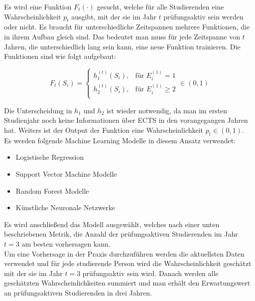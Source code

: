 Es wird eine Funktion $F_t(\cdot)$ gesucht, welche f\"ur alle Studierenden eine Wahrscheinlichkeit $p_t$ ausgibt, mit der
sie im Jahr $t$ pr\"ufungsaktiv sein werden oder nicht. Es braucht f\"ur unterschiedliche Zeitspannen mehrere Funktionen, die in ihrem Aufbau gleich sind.
Das bedeutet man muss f\"ur jede Zeitspanne von $t$ Jahren, die unterschiedlich lang sein kann, eine neue Funktion trainieren.
Die Funktionen sind wie folgt aufgebaut:

$$
  F_t(S_i)=
  \left\{
  \begin{array}{lr}
    h_1^{(t)}(S_i), & \text{für }E_i^{(1)} = 1    \\
    h_2^{(t)}(S_i), & \text{für }E_i^{(1)} \geq 2 \\
  \end{array}
  \right.
  \in (0,1)
$$

Die Unterscheidung in $h_1$ und $h_2$ ist wieder notwendig, da man im ersten Studienjahr noch keine Informationen \"uber ECTS in den vorangegangen Jahren hat.
Weiters ist der Output der Funktion eine Wahrscheinlichkeit $p_t \in (0,1)$. \\

Es werden folgende Machine Learning Modelle in diesem Ansatz verwendet:
\begin{itemize}
  \item Logistische Regression
  \item Support Vector Machine Modelle
  \item Random Forest Modelle
  \item K\"unstliche Neuronale Netzwerke
\end{itemize}

Es wird anschlie{\ss}end das Modell ausgew\"ahlt, welches nach einer unten beschriebenen Metrik, die Anzahl der pr\"ufungsaktiven Studierenden
im Jahr $t = 3$ am besten vorhersagen kann. \\

Um eine Vorhersage in der Praxis durchzuf\"uhren werden die aktuellsten Daten verwendet und f\"ur jede studierende Person wird die
Wahrscheinlichkeit gesch\"atzt mit der sie im Jahr $t=3$ pr\"ufungsaktiv sein wird. Danach werden alle gesch\"atzten Wahrscheinlichkeiten summiert und
man erh\"alt den Erwartungswert an pr\"ufungsaktiven Studierenden in drei Jahren.




